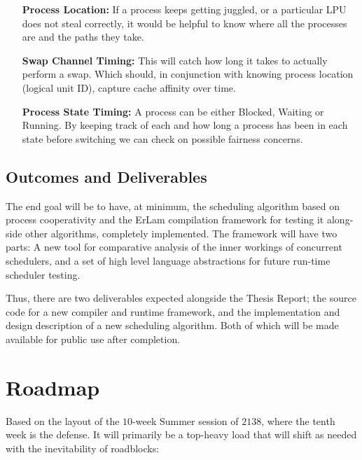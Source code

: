 \begin{itemize}
\item[{\bf Process Location:}] If a process keeps getting juggled, or a particular LPU does not steal correctly, 
	it would be helpful to know where all the processes are and the paths they take.

\item[{\bf Swap Channel Timing:}] This will catch how long it takes to actually perform a swap. Which should, in 
	conjunction with knowing process location (logical unit ID), capture cache affinity over time.

\item[{\bf Process State Timing:}] A process can be either Blocked, Waiting or Running. By keeping track of each
	and how long a process has been in each state before switching we can check on possible fairness concerns.
\end{itemize}

\subsection{Outcomes and Deliverables}
\label{sec:outcomes}

The end goal will be to have, at minimum, the scheduling algorithm based on process cooperativity and 
the ErLam compilation framework for testing it along-side other algorithms, completely implemented. The 
framework will have two parts: A new tool for comparative analysis of the inner workings of concurrent 
schedulers, and a set of high level language abstractions for future run-time scheduler testing.

Thus, there are two deliverables expected alongside the Thesis Report; the source code for a new compiler 
and runtime framework, and the implementation and design description of a new scheduling algorithm. Both
of which will be made available for public use after completion.

\pagebreak
\section{Roadmap}

Based on the layout of the $10$-week Summer session of $2138$, where the tenth week
is the defense. It will primarily be a top-heavy load that will shift as needed
with the inevitability of roadblocks:\\

